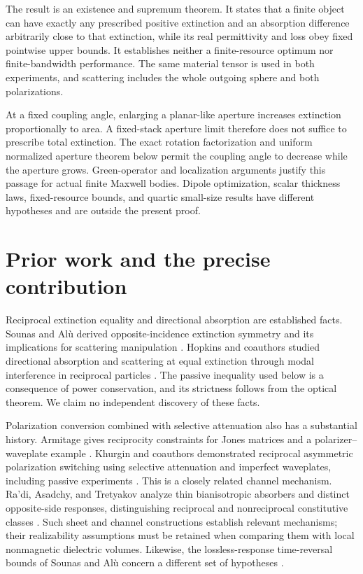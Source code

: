 \documentclass[11pt]{article}
\begin{document}
The result is an existence and supremum theorem. It states that a finite object can have exactly any prescribed positive extinction and an absorption difference arbitrarily close to that extinction, while its real permittivity and loss obey fixed pointwise upper bounds. It establishes neither a finite-resource optimum nor finite-bandwidth performance. The same material tensor is used in both experiments, and scattering includes the whole outgoing sphere and both polarizations.

At a fixed coupling angle, enlarging a planar-like aperture increases extinction proportionally to area. A fixed-stack aperture limit therefore does not suffice to prescribe total extinction. The exact rotation factorization and uniform normalized aperture theorem below permit the coupling angle to decrease while the aperture grows. Green-operator and localization arguments justify this passage for actual finite Maxwell bodies. Dipole optimization, scalar thickness laws, fixed-resource bounds, and quartic small-size results have different hypotheses and are outside the present proof.

\section{Prior work and the precise contribution}\label{sec:prior}
Reciprocal extinction equality and directional absorption are established facts. Sounas and Al\`u derived opposite-incidence extinction symmetry and its implications for scattering manipulation \citep{SounasAlu2014}. Hopkins and coauthors studied directional absorption and scattering at equal extinction through modal interference in reciprocal particles \citep{Hopkins2015}. The passive inequality used below is a consequence of power conservation, and its strictness follows from the optical theorem. We claim no independent discovery of these facts.

Polarization conversion combined with selective attenuation also has a substantial history. Armitage gives reciprocity constraints for Jones matrices and a polarizer--waveplate example \citep{Armitage2014}. Khurgin and coauthors demonstrated reciprocal asymmetric polarization switching using selective attenuation and imperfect waveplates, including passive experiments \citep{Khurgin2021}. This is a closely related channel mechanism. Ra'di, Asadchy, and Tretyakov analyze thin bianisotropic absorbers and distinct opposite-side responses, distinguishing reciprocal and nonreciprocal constitutive classes \citep{Radi2013}. Such sheet and channel constructions establish relevant mechanisms; their realizability assumptions must be retained when comparing them with local nonmagnetic dielectric volumes. Likewise, the lossless-response time-reversal bounds of Sounas and Al\`u concern a different set of hypotheses \citep{SounasAlu2017}.
\end{document}

